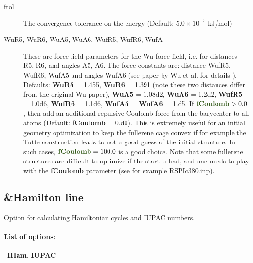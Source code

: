 \documentclass[article,a4paper,twoside]{memoir}
\newcommand{\paramname}[1]{{\color{green}\textbf{#1}}}
\begin{document}
\begin{description}
\item[ftol] The convergence tolerance on the energy (Default: $5.0 \times 10^{-7}$ kJ/mol)
\item[{WuR5, WuR6, WuA5, WuA6, WufR5, WufR6, WufA}] These are force-field parameters for the Wu force field, i.e. for
distances R5, R6, and angles A5, A6. The force constants are: distance WufR5, WufR6, WufA5 and
angles WufA6 (see paper by Wu et al. for details \cite{Wu87}). Defaults: \paramname{WuR5} =  1.455, \paramname{WuR6} = 1.391 
(note these two distances differ from the original Wu paper), \paramname{WuA5} = 1.08d2, 
\paramname{WuA6} = 1.2d2, \paramname{WufR5} = 1.0d6, \paramname{WufR6} = 1.1d6, \paramname{WufA5} = \paramname{WufA6} = 1.d5.
If $\paramname{fCoulomb} > 0.0$, then add an additional repulsive Coulomb force from the barycenter to all atoms (Default:  \paramname{fCoulomb} = 0.d0).
This is extremely useful for an initial geometry optimization to keep the fullerene cage convex if for example the Tutte construction leads to not
a good guess of the initial structure. In such cases, $\paramname{fCoulomb} = 100.0$ is a good choice. Note that some fullerene structures
are difficult to optimize if the start is bad, and one needs to play with the \paramname{fCoulomb} parameter (see for example {RSPIc380.inp}).
\end{description}


\subsection{\&Hamilton line}
Option for calculating Hamiltonian cycles and IUPAC numbers.
\paragraph{List of options:}\  \paramname{IHam}, \paramname{IUPAC}
\end{document}
